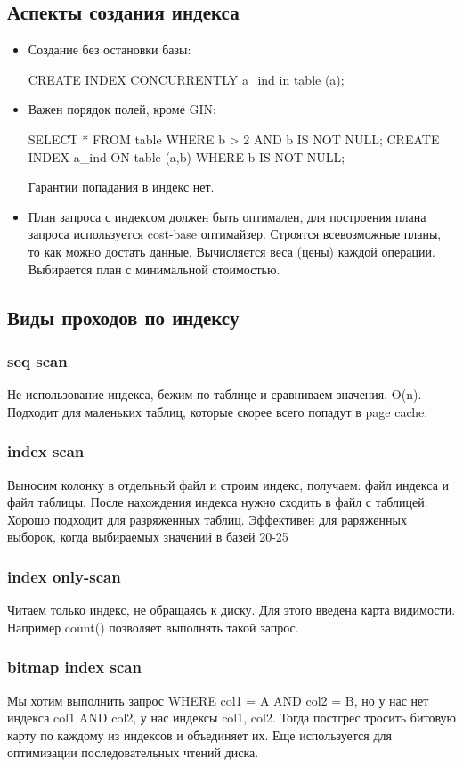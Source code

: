 \subsection{Аспекты создания индекса}

\begin{itemize}
\item Создание без остановки базы:
\begin{python}
CREATE INDEX CONCURRENTLY a\_ind in table (a);
\end{python}
\item Важен порядок полей, кроме GIN:
\begin{python}
SELECT * FROM table WHERE b > 2 AND b IS NOT NULL;
CREATE INDEX a_ind ON table (a,b) WHERE b IS NOT NULL;
\end{python}
Гарантии попадания в индекс нет.
\item План запроса с индексом должен быть оптимален, для построения плана запроса используется cost-base оптимайзер. Строятся всевозможные планы, то как можно достать данные. Вычисляется веса (цены) каждой операции. Выбирается план с минимальной стоимостью.
\end{itemize}

\subsection{Виды проходов по индексу}

\subsubsection{seq scan}
Не использование индекса, бежим по таблице и сравниваем значения, O(n). Подходит для маленьких таблиц, которые скорее всего попадут в page cache.
\subsubsection{index scan}
Выносим колонку в отдельный файл и строим индекс, получаем: файл индекса и файл таблицы. После нахождения индекса нужно сходить в файл с таблицей. Хорошо подходит для разряженных таблиц. Эффективен для раряженных выборок, когда выбираемых значений в базей 20-25%
\subsubsection{index only-scan}
Читаем только индекс, не обращаясь к диску. Для этого введена карта видимости. Например count() позволяет выполнять такой запрос.
\subsubsection{bitmap index scan}
Мы хотим выполнить запрос WHERE col1 = A AND col2 = B, но у нас нет индекса col1 AND col2, у нас индексы col1, col2. Тогда постгрес тросить битовую карту по каждому из индексов и объединяет их.
Еще используется для оптимизации последовательных чтений диска.

